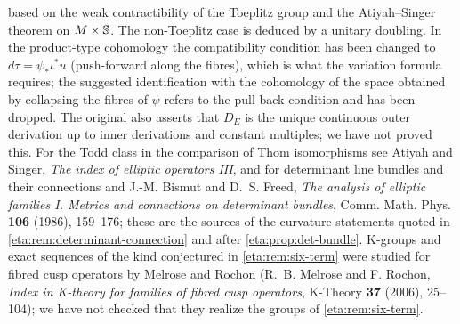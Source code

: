 based on the weak contractibility of the Toeplitz group and the Atiyah--Singer theorem on
$M\times\mathbb{S}$. The non-Toeplitz case is deduced by a unitary doubling. In the product-type
cohomology the compatibility condition has been changed to $d\tau=\psi_*\iota^*u$ (push-forward
along the fibres), which is what the variation formula requires; the suggested
identification with the cohomology of the space obtained by collapsing the fibres of
$\psi$ refers to the pull-back condition and has been dropped. The original also asserts
that $D_E$ is the unique continuous outer derivation up to inner derivations and
constant multiples; we have not proved this. For the Todd class in the comparison of
Thom isomorphisms see Atiyah and Singer, \emph{The index of elliptic operators III}, and
for determinant line bundles and their connections \cite{Quillen} and J.-M. Bismut and
D.~S. Freed, \emph{The analysis of elliptic families I. Metrics and connections on
determinant bundles}, Comm. Math. Phys. \textbf{106} (1986), 159--176; these are the
sources of the curvature statements quoted in \cref{eta:rem:determinant-connection} and
after \cref{eta:prop:det-bundle}. K-groups and exact sequences of the kind conjectured
in \cref{eta:rem:six-term} were studied for fibred cusp operators by Melrose and Rochon
(R.~B. Melrose and F. Rochon, \emph{Index in K-theory for families of fibred cusp
operators}, K-Theory \textbf{37} (2006), 25--104); we have not checked that they realize
the groups of \cref{eta:rem:six-term}.
